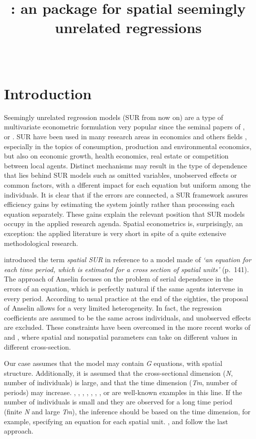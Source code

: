 \documentclass[article]{jss}
\author{
\\
}
\title{\pkg{spsur}: an \proglang{R} package for spatial seemingly unrelated regressions}
\begin{document}
\hypertarget{introduction}{%
\section{Introduction}\label{introduction}}

Seemingly unrelated regression models (SUR from now on) are a type of multivariate econometric formulation very popular since the seminal papers of \citet{Zellner1962}, \citet{Malinvaud1970} or \citet{Theil1971}. SUR have been used in many research areas in economics and others fields \citep[for instance, see][]{Fiebig2007}, especially in the topics of consumption, production and environmental economics, but also on economic growth, health economics, real estate or competition between local agents. Distinct mechanisms may result in the type of dependence that lies behind SUR models such as omitted variables, unobserved effects or common factors, with a dfferent impact for each equation but uniform among the individuals. It is clear that if the errors are connected, a SUR framework assures efficiency gains by estimating the system jointly rather than processing each equation separately. These gains explain the relevant position that SUR models occupy in the applied research agenda. Spatial econometrics is, surprisingly, an exception: the applied literature is very short in spite of a quite extensive methodological research.

\citet{Anselin1988a} introduced the term \emph{spatial SUR} in reference to a model made of \emph{`an equation for each time period, which is estimated for a cross section of spatial units'} (p.~141). The approach of Anselin focuses on the problem of serial dependence in the errors of an equation, which is perfectly natural if the same agents intervene in every period. According to usual practice at the end of the eighties, the proposal of Anselin allows for a very limited heterogeneity. In fact, the regression coefficients are assumed to be the same across individuals, and unobserved effects are excluded. These constraints have been overcomed in the more recent works of \citet{Mur2010} and \citet{Anselin2016}, where spatial and nonspatial parameters can take on different values in different cross-section.

Our case assumes that the model may contain \emph{G} equations, with spatial structure. Additionally, it is assumed that the cross-sectional dimension (\emph{N}, number of individuals) is large, and that the time dimension (\emph{Tm}, number of periods) may increase. \citet{Rey1999}, \citet{Egger2004}, \citet{LeGallo2006}, \citet{Fingleton2007}, \citet{Moscone2007}, \citet{LeGallo2008}, \citet{Lauridsen2010}, \citet{Kakamu2012} or \citet{Bech2012} are well-known examples in this line. If the number of individuals is small and they are observed for a long time period (finite \emph{N} and large \emph{Tm}), the inference should be based on the time dimension, for example, specifying an equation for each spatial unit. \citet{Arora1977}, \citet{Hordijk1977} and \citet{White1982} follow the last approach.
\end{document}
